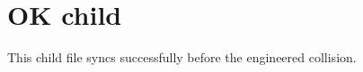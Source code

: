 \section{OK child}
\label{sec:ok}

This child file syncs successfully before the engineered collision.
